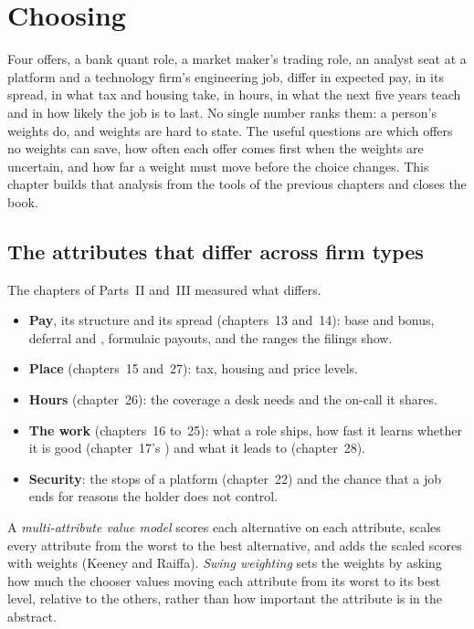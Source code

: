 \chapter{Choosing}\label{ch:in:choosing}

Four offers, a bank quant role, a market maker's trading role, an analyst seat at a platform and a technology firm's
engineering job, differ in expected pay, in its spread, in what tax and housing take, in hours, in what the next five
years teach and in how likely the job is to last. No single number ranks them: a person's weights do, and weights are
hard to state. The useful questions are which offers no weights can save, how often each offer comes first when the
weights are uncertain, and how far a weight must move before the choice changes. This chapter builds that analysis
from the tools of the previous chapters and closes the book.

\section{The attributes that differ across firm types}

The chapters of Parts~II and~III measured what differs.
\begin{itemize}
\item \textbf{Pay}, its structure and its spread (chapters~13 and~14): base and bonus, deferral and ,
formulaic payouts, and the ranges the filings show.
\item \textbf{Place} (chapters~15 and~27): tax, housing and price levels.
\item \textbf{Hours} (chapter~26): the coverage a desk needs and the on-call it shares.
\item \textbf{The work} (chapters~16 to~25): what a role ships, how fast it learns whether it is good (chapter~17's
) and what it leads to (chapter~28).
\item \textbf{Security}: the stops of a platform (chapter~22) and the chance that a job ends for reasons the holder does
not control.
\end{itemize}

\begin{definition}\label{def:in:choosing:mavm}
A \emph{multi-attribute value model} scores each alternative on each attribute, scales
every attribute from the worst to the best alternative, and adds the scaled scores with weights (Keeney and Raiffa).
\emph{Swing weighting} sets the weights by asking how much the chooser values moving each
attribute from its worst to its best level, relative to the others, rather than how important the attribute is in the
abstract.
\end{definition}

